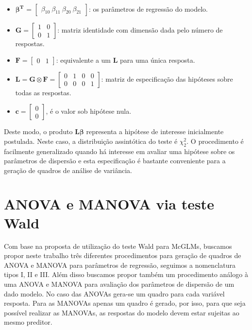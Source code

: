 \begin{itemize}
  
  \item $\boldsymbol{\beta^{T}}$ = $\begin{bmatrix} \beta_{10} \  \beta_{11} \  \beta_{20} \  \beta_{21} \end{bmatrix}$: os parâmetros de regressão do modelo.


\item $\boldsymbol{G} = \begin{bmatrix} 1 & 0 \\ 0 & 1  \end{bmatrix}$: matriz identidade com dimensão dada pelo número de respostas.

\item $\boldsymbol{F} = \begin{bmatrix} 0 & 1 \end{bmatrix}$: equivalente a um $\boldsymbol{L}$ para uma única resposta.

\item $\boldsymbol{L} = \boldsymbol{G} \otimes \boldsymbol{F} =  \begin{bmatrix} 0 & 1 & 0 & 0 \\
0 & 0 & 0 & 1 \end{bmatrix}$: matriz de especificação das hipóteses sobre todas as respostas.
 
\item $\boldsymbol{c} = \begin{bmatrix} 0 \\ 0 \end{bmatrix}$, é o valor sob hipótese nula. 

\end{itemize}

Deste modo, o produto $\boldsymbol{L}\boldsymbol{\beta}$ representa a hipótese de interesse inicialmente postulada. Neste caso, a distribuição assintótica do teste é $\chi^2_2$. O procedimento é facilmente generalizado quando há interesse em avaliar uma hipótese sobre os parâmetros de dispersão e esta especificação é bastante conveniente para a geração de quadros de análise de variância.


\section{ANOVA e MANOVA via teste Wald}

Com base na proposta de utilização do teste Wald para McGLMs, buscamos propor neste trabalho três diferentes procedimentos para geração de quadros de ANOVA e MANOVA para parâmetros de regressão, seguimos a nomenclatura tipos I, II e III. Além disso buscamos propor também um procedimento análogo à uma ANOVA e MANOVA para avaliação dos parâmetros de dispersão de um dado modelo. No caso das ANOVAs gera-se um quadro para cada variável resposta. Para as MANOVAs apenas um quadro é gerado, por isso, para que seja possível realizar as MANOVAs, as respostas do modelo devem estar sujeitas ao mesmo preditor.

